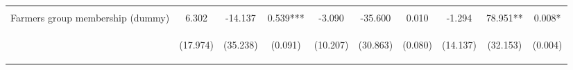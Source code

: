 \begin{center}
\begin{tabular}{lccccccccc}
\vspace{4pt} & \begin{footnotesize}[0.898]\end{footnotesize} & \begin{footnotesize}[0.691]\end{footnotesize} & \begin{footnotesize}[0.284]\end{footnotesize} & \begin{footnotesize}[0.056]\end{footnotesize} & \begin{footnotesize}[0.931]\end{footnotesize} & \begin{footnotesize}[0.460]\end{footnotesize} & \begin{footnotesize}[0.995]\end{footnotesize} & \begin{footnotesize}[0.000]\end{footnotesize} & \begin{footnotesize}[0.000]\end{footnotesize} \\
Farmers group membership (dummy) & 6.302 & -14.137 & 0.539*** & -3.090 & -35.600 & 0.010 & -1.294 & 78.951** & 0.008* \\
 & \begin{footnotesize}(17.974)\end{footnotesize} & \begin{footnotesize}(35.238)\end{footnotesize} & \begin{footnotesize}(0.091)\end{footnotesize} & \begin{footnotesize}(10.207)\end{footnotesize} & \begin{footnotesize}(30.863)\end{footnotesize} & \begin{footnotesize}(0.080)\end{footnotesize} & \begin{footnotesize}(14.137)\end{footnotesize} & \begin{footnotesize}(32.153)\end{footnotesize} & \begin{footnotesize}(0.004)\end{footnotesize} \\

\end{tabular}
\end{center}
